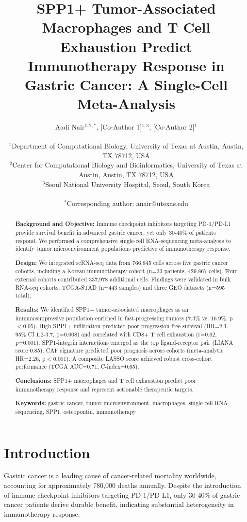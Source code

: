 \documentclass[12pt,twoside]{article}
\title{SPP1+ Tumor-Associated Macrophages and T Cell Exhaustion Predict Immunotherapy Response in Gastric Cancer: A Single-Cell Meta-Analysis}
\author{Aadi Nair$^{1,2,*}$, [Co-Author 1]$^{1,3}$, [Co-Author 2]$^{1}$ \\ \\ $^1$Department of Computational Biology, University of Texas at Austin, Austin, TX 78712, USA \\ $^2$Center for Computational Biology and Bioinformatics, University of Texas at Austin, Austin, TX 78712, USA \\ $^3$Seoul National University Hospital, Seoul, South Korea \\ \\ $^*$Corresponding author: anair@utexas.edu}
\date{}
\begin{document}
\maketitle

\begin{abstract}

\noindent \textbf{Background and Objective:} Immune checkpoint inhibitors targeting PD-1/PD-L1 provide survival benefit in advanced gastric cancer, yet only 30-40\% of patients respond. We performed a comprehensive single-cell RNA-sequencing meta-analysis to identify tumor microenvironment populations predictive of immunotherapy response.

\noindent \textbf{Design:} We integrated scRNA-seq data from 766,845 cells across five gastric cancer cohorts, including a Korean immunotherapy cohort (n=33 patients, 429,867 cells). Four external cohorts contributed 337,978 additional cells. Findings were validated in bulk RNA-seq cohorts: TCGA-STAD (n=443 samples) and three GEO datasets (n=595 total).

\noindent \textbf{Results:} We identified SPP1+ tumor-associated macrophages as an immunosuppressive population enriched in fast-progressing tumors (7.3\% vs. 16.9\%, p$<$0.05). High SPP1+ infiltration predicted poor progression-free survival (HR=2.1, 95\% CI 1.2-3.7, p=0.008) and correlated with CD8+ T cell exhaustion (r=0.62, p=0.001). SPP1-integrin interactions emerged as the top ligand-receptor pair (LIANA score 0.85). CAF signature predicted poor prognosis across cohorts (meta-analytic HR=2.26, p$<$0.001). A composite LASSO score achieved robust cross-cohort performance (TCGA AUC=0.71, C-index=0.65).

\noindent \textbf{Conclusions:} SPP1+ macrophages and T cell exhaustion predict poor immunotherapy response and represent actionable therapeutic targets.

\noindent \textbf{Keywords:} gastric cancer, tumor microenvironment, macrophages, single-cell RNA-sequencing, SPP1, osteopontin, immunotherapy

\end{abstract}

\clearpage

\section{Introduction}

Gastric cancer is a leading cause of cancer-related mortality worldwide, accounting for approximately 780,000 deaths annually. Despite the introduction of immune checkpoint inhibitors targeting PD-1/PD-L1, only 30-40\% of gastric cancer patients derive durable benefit, indicating substantial heterogeneity in immunotherapy response.
\end{document}
